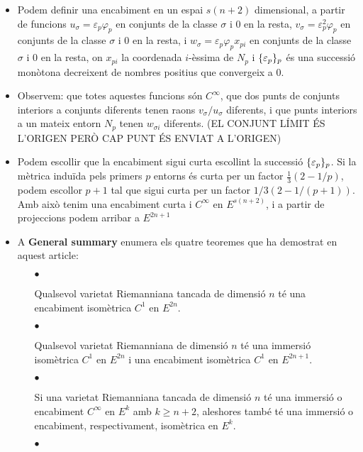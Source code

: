 {\begin{itemize}
    \item Podem definir una encabiment en un espai $s(n+2)$ dimensional, a partir de funcions $u_\sigma=\varepsilon_p\varphi_p$ en conjunts de la classe $\sigma$ i $0$ en la resta, $v_\sigma=\varepsilon^2_p\varphi_p$ en conjunts de la classe $\sigma$ i $0$ en la resta, i $w_\sigma=\varepsilon_p\varphi_px_{pi}$ en conjunts de la classe $\sigma$ i $0$ en la resta, on $x_{pi}$ la coordenada $i$-èssima de $N_p$ i $\{\varepsilon_p\}_p$ és una successió monòtona decreixent de nombres positius que convergeix a $0$.
    \item Observem: que totes aquestes funcions són $C^\infty$, que dos punts de conjunts interiors a conjunts diferents tenen raons $v_\sigma/u_\sigma$ diferents, i que punts interiors a un mateix entorn $N_p$ tenen $w_{\sigma i}$ diferents. (EL CONJUNT LÍMIT ÉS L'ORIGEN PERÒ CAP PUNT ÉS ENVIAT A L'ORIGEN)
    \item Podem escollir que la encabiment sigui curta escollint la successió $\{\varepsilon_p\}_p$. Si la mètrica induïda pels primers $p$ entorns és curta per un factor $\frac13(2-1/p)$, podem escollor $p+1$ tal que sigui curta per un factor $1/3(2-1/(p+1))$. Amb això tenim una encabiment curta i $C^\infty$ en $E^{s(n+2)}$, i a partir de projeccions podem arribar a $E^{2n+1}$
    \item A \textbf{General summary} enumera els quatre teoremes que ha demostrat en aquest article:
    \begin{itemize}
        \item[$\bullet$] \begin{teo}
            Qualsevol varietat Riemanniana tancada de dimensió $n$ té una encabiment isomètrica $C^1$ en $E^{2n}$.
        \end{teo}
        \item[$\bullet$] \begin{teo}
            Qualsevol varietat Riemanniana de dimensió $n$ té una immersió isomètrica $C^1$ en $E^{2n}$ i una encabiment isomètrica $C^1$ en $E^{2n+1}$.
        \end{teo}
        \item[$\bullet$] \begin{teo}
            Si una varietat Riemanniana tancada de dimensió $n$ té una immersió o encabiment $C^\infty$ en $E^{k}$ amb $k\ge n+2$, aleshores també té una immersió o encabiment, respectivament, isomètrica en $E^{k}$.
        \end{teo}
        \item[$\bullet$] \begin{teo}

\end{teo}
\end{itemize}
\end{itemize}}
